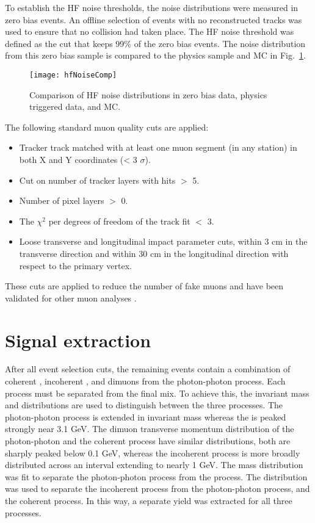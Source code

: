       To establish the HF noise thresholds, the noise distributions were 
        measured in zero bias events. 
      An offline selection of events with no reconstructed tracks was used
        to ensure that no collision had taken place. 
      The HF noise threshold was defined as the cut that keeps 99\% of the 
        zero bias events.
      The noise distribution from this zero bias sample is compared to the 
        physics sample and MC in Fig.~\ref{fig:hfNoiseDist}.

      \begin{figure}[!Hhbt]
        \centering
        \texttt{[image: hfNoiseComp]}
        \caption{Comparison of HF noise distributions in zero bias data, 
          physics triggered data, and MC.}
        \label{fig:hfNoiseDist}
      \end{figure}

      The following standard muon quality cuts are applied:
      \begin{itemize}
        \item Tracker track matched with at least one muon segment 
          (in any station) in both X and Y coordinates (< 3 $\sigma$).
        \item Cut on number of tracker layers with hits $>$ 5.
        \item Number of pixel layers $>$ 0.
        \item The $\chi^{2}$ per degrees of freedom of the track fit $<$ 3. 
        \item Loose transverse and longitudinal impact parameter cuts, within 3 
          cm in the transverse direction and within 30 cm in the longitudinal 
          direction with respect to the primary vertex.
      \end{itemize}
      These cuts are applied to reduce the number of fake muons and have been 
        validated for other muon analyses \cite{cmsJpPP}.

  \section{\label{sec:sigEx} Signal extraction}
    After all event selection cuts, the remaining events contain a combination 
      of coherent \JPsi{}, incoherent \JPsi{}, and dimuons from the 
      photon-photon process.
    Each process must be separated from the final mix.
    To achieve this, the invariant mass and \pt{} distributions are used 
      to distinguish between the three processes. 
    The photon-photon process is extended in invariant mass whereas the 
      \JPsi{} is peaked strongly near 3.1 GeV.
    The dimuon transverse momentum distribution of the photon-photon and 
      the coherent process have similar distributions, both are sharply peaked 
        below 0.1 GeV, whereas the incoherent process is more broadly 
        distributed across an interval extending to nearly 1 GeV.
    The mass distribution was fit to separate the photon-photon process from
      the \JPsi{} process.
    The \pt{} distribution was used to separate the incoherent process from 
      the photon-photon process, and the coherent process. 
    In this way, a separate yield was extracted for all three processes. 

